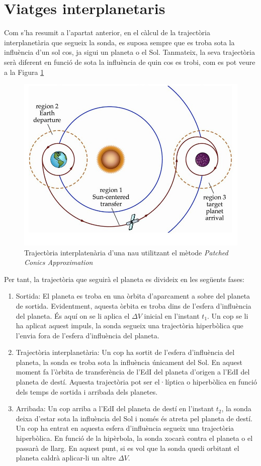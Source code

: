 \section{Viatges interplanetaris}
Com s'ha resumit a l'apartat anterior, en el càlcul de la trajectòria interplanetària que segueix la sonda, es suposa sempre que es troba sota la influència d'un sol cos, ja sigui un planeta o el Sol. Tanmateix, la seva trajectòria serà diferent en funció de sota la influència de quin cos es trobi, com es pot veure a la Figura \ref{patchedconics}

\begin{figure}[H]
	\centering
	\includegraphics[scale=0.5]{./plots/patchedconics}
	\caption{Trajectòria interplatenària d'una nau utilitzant el mètode \textit{Patched Conics Approximation}}
	\label{patchedconics}
\end{figure}

Per tant, la trajectòria que seguirà el planeta es divideix en les següents fases:
\begin{enumerate}
	\item Sortida: El planeta es troba en una òrbita d'aparcament a sobre del planeta de sortida. Evidentment, aquesta òrbita es troba dins de l'esfera d'influència del planeta. És aquí on se li aplica el $\Delta V$ inicial en l'instant $t_{1}$. Un cop se li ha aplicat aquest impuls, la sonda segueix una trajectòria hiperbòlica que l'envia fora de l'esfera d'influència del planeta.
	\item Trajectòria interplanetària: Un cop ha sortit de l'esfera d'influència del planeta, la sonda es troba sota la influència únicament del Sol. En aquest moment fa l'òrbita de transferència de l'EdI del planeta d'origen a l'EdI del planeta de destí. Aquesta trajectòria pot ser el·líptica o hiperbòlica en funció dels temps de sortida i arribada dels planetes.
	\item Arribada: Un cop arriba a l'EdI del planeta de destí en l'instant $t_{2}$, la sonda deixa d'estar sota la influència del Sol i només és atreta pel planeta de destí. Un cop ha entrat en aquesta esfera d'influència segueix una trajectòria hiperbòlica. En funció de la hipèrbola, la sonda xocarà contra el planeta o el passarà de llarg. En aquest punt, si es vol que la sonda quedi orbitant el planeta caldrà aplicar-li un altre $\Delta V$.
\end{enumerate}